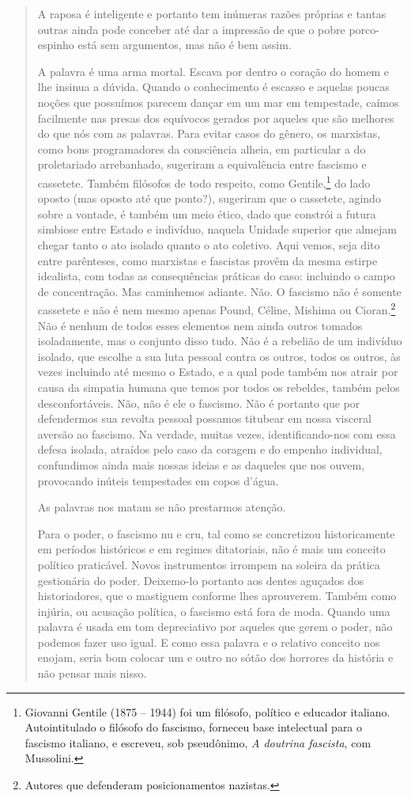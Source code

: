 \begin{quote}
A raposa é inteligente e portanto tem inúmeras razões próprias e tantas
outras ainda pode conceber até dar a impressão de que o pobre
porco-espinho está sem argumentos, mas não é bem assim.

A palavra é uma arma mortal. Escava por dentro o coração do homem e lhe
insinua a dúvida. Quando o conhecimento é escasso e aquelas poucas
noções que possuímos parecem dançar em um mar em tempestade, caímos
facilmente nas presas dos equívocos gerados por aqueles que são melhores
do que nós com as palavras. Para evitar casos do gênero, os marxistas,
como bons programadores da consciência alheia, em particular a do
proletariado arrebanhado, sugeriram a equivalência entre fascismo e
cassetete. Também filósofos de todo respeito, como Gentile,\footnote{Giovanni Gentile (1875 -- 1944) foi um filósofo, político e educador
  italiano. Autointitulado o filósofo do fascismo, forneceu base
  intelectual para o fascismo italiano, e escreveu, sob pseudônimo,
  \emph{A doutrina fascista}, com Mussolini.} do lado oposto (mas oposto até que ponto?), sugeriram
que o cassetete, agindo sobre a vontade, é também um meio ético, dado
que constrói a futura simbiose entre Estado e indivíduo, naquela Unidade
superior que almejam chegar tanto o ato isolado quanto o ato coletivo.
Aqui vemos, seja dito entre parênteses, como marxistas e fascistas
provêm da mesma estirpe idealista, com todas as consequências práticas
do caso: incluindo o campo de concentração. Mas caminhemos adiante. Não.
O fascismo não é somente cassetete e não é nem mesmo apenas Pound,
Céline, Mishima ou Cioran.\footnote{Autores que defenderam posicionamentos nazistas.} Não é nenhum de todos esses elementos nem ainda outros
tomados isoladamente, mas o conjunto disso tudo. Não é a rebelião de um
indivíduo isolado, que escolhe a sua luta pessoal contra os outros,
todos os outros, às vezes incluindo até mesmo o Estado, e a qual pode
também nos atrair por causa da simpatia humana que temos por todos os
rebeldes, também pelos desconfortáveis. Não, não é ele o fascismo. Não é
portanto que por defendermos sua revolta pessoal possamos titubear em
nossa visceral aversão ao fascismo. Na verdade, muitas vezes,
identificando-nos com essa defesa isolada, atraídos pelo caso da coragem
e do empenho individual, confundimos ainda mais nossas ideias e as
daqueles que nos ouvem, provocando inúteis tempestades em copos d'água.

As palavras nos matam se não prestarmos atenção.

Para o poder, o fascismo nu e cru, tal como se concretizou
historicamente em períodos históricos e em regimes ditatoriais, não é
mais um conceito político praticável. Novos instrumentos irrompem na
soleira da prática gestionária do poder. Deixemo-lo portanto aos dentes
aguçados dos historiadores, que o mastiguem conforme lhes aprouverem.
Também como injúria, ou acusação política, o fascismo está fora de moda.
Quando uma palavra é usada em tom depreciativo por aqueles que gerem o
poder, não podemos fazer uso igual. E como essa palavra e o relativo
conceito nos enojam, seria bom colocar um e outro no sótão dos horrores
da história e não pensar mais nisso.


\end{quote}
